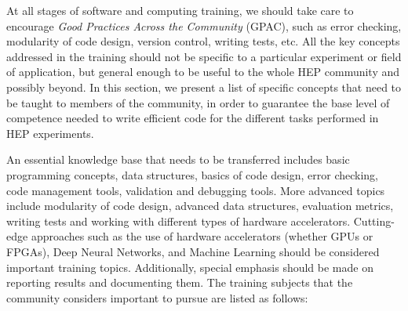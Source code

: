 \documentclass[12pt,a4paper]{article}
\begin{document}
At all stages of software and computing training, we should take care to
encourage \emph{Good Practices Across the Community} (GPAC), such as error
checking, modularity of code design, version control, writing tests, etc. All
the key concepts addressed in the training should not be specific to a
particular experiment or field of application, but general enough to be useful
to the whole HEP community and possibly beyond. In this section, we present a
list of specific concepts that need to be taught to members of the community, in
order to guarantee the base level of competence needed to write efficient code
for the different tasks performed in HEP experiments.
 
An essential knowledge base that needs to be transferred includes basic
programming concepts, data structures, basics of code design, error checking,
code management tools, validation and debugging tools. More advanced topics
include modularity of code design, advanced data structures, evaluation metrics,
writing tests and working with different types of hardware accelerators.
Cutting-edge approaches such as the use of hardware accelerators (whether GPUs
or FPGAs), Deep Neural Networks, and Machine Learning should be considered
important training topics. Additionally, special emphasis should be made on
reporting results and documenting them.
The training subjects that the community considers important to pursue are
listed as follows:
\end{document}
